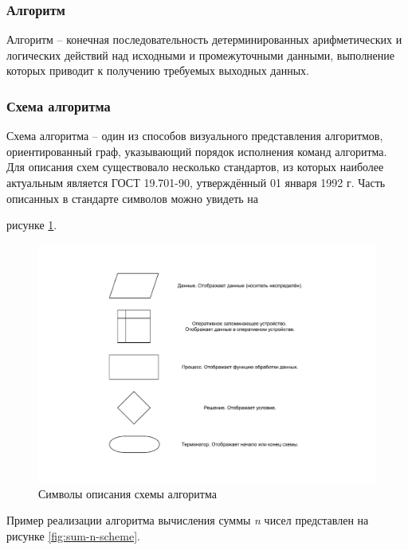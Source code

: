 \subsubsection{Алгоритм}

Алгоритм -- конечная последовательность детерминированных арифметических и логических действий над исходными и промежуточными данными, выполнение которых приводит к получению требуемых выходных данных\cite{algorithms}.

\subsubsection{Схема алгоритма}

Схема алгоритма\cite{algorithms} -- один из способов визуального представления алгоритмов, ориентированный  граф,  указывающий  порядок  исполнения  команд  алгоритма. Для  описания  схем  существовало  несколько  стандартов,  из  которых  наиболее актуальным является ГОСТ 19.701-90\cite{gost}, утверждённый 01 января 1992 г. Часть описанных в стандарте символов можно увидеть на 

\noindent рисунке \ref{fig:block-scheme}.~

\begin{figure}[h!btp]
	\centering
	\includegraphics[width=450pt]{inc/block-scheme.pdf}
	\caption{Символы описания схемы алгоритма}
	\label{fig:block-scheme}	
\end{figure}

\clearpage

Пример реализации алгоритма вычисления суммы \textit{n} чисел представлен на рисунке \ref{fig:sum-n-scheme}.


